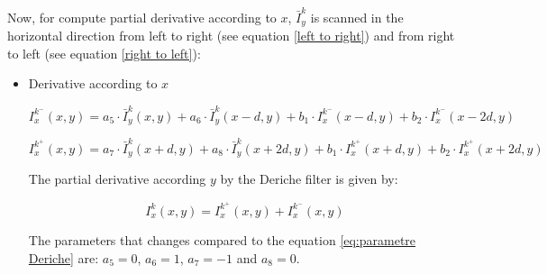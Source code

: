 \documentclass[twoside]{article}
\newcommand\Smo{\bar} %
\DeclareMathOperator{\e}{e}
\begin{document}
Now, for compute partial derivative according to $x$, $\Smo {I}^{k}_y$ is scanned in the horizontal direction from left to right (see equation \eqref{left to right})  and from right to left (see equation \eqref{right to left}):


\begin{itemize}
	
	
	\item Derivative according to $x$ 
	
	
		\begin{equation}
		\label{left to right}
			I^{k^-}_x(x,y)= a_5 \cdot \Smo {I}^{k}_y(x,y) + a_6\cdot \Smo {I}^{k}_y(x-d,y) + b_1 \cdot I^{k^-}_x(x-d,y) + b_2 \cdot  I^{k^-}_x(x-2d,y)
		\end{equation}
		
		
		
		\begin{equation}
		\label{right to left}
			I^{k^+}_x(x,y)= a_7 \cdot \Smo {I}^{k}_y(x+d,y) + a_8 \cdot \Smo {I}^{k}_y(x+2d,y) + b_1 \cdot I^{k^+}_x(x+d,y) + b_2 \cdot I^{k^+}_x(x+2d,y)
		\end{equation}
		
	
		The partial derivative according $y$ by the Deriche filter is given by:	
		
		\begin{equation}
			I^{k}_x(x,y)=I^{k^+}_x(x,y) + I^{k^-}_x(x,y)
		\end{equation}
	
	






The parameters that changes compared to the equation \eqref{eq:parametre Deriche}	are: $a_5 = 0$, $a_6 = 1$, $a_7 = -1$ and $a_8 = 0$.
			



\end{itemize}
\end{document}
